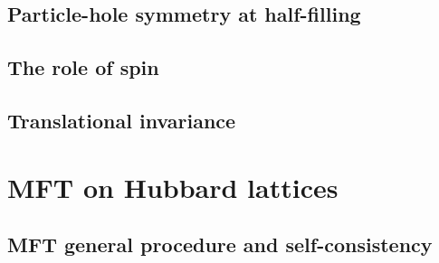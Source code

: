 \subsection{Particle-hole symmetry at half-filling}

\todo

\subsection{The role of spin}
\todo

\subsection{Translational invariance}
\todo

\section{MFT on Hubbard lattices}
\todo

\subsection{MFT general procedure and self-consistency}

